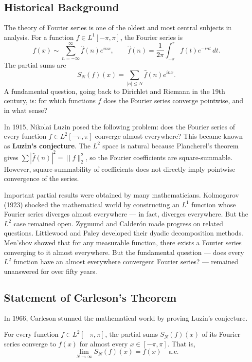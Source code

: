 \subsection{Historical Background}

The theory of Fourier series is one of the oldest and most central subjects in analysis. For a function \(f \in L^1[-\pi,\pi]\), the Fourier series is
\[
f(x) \sim \sum_{n=-\infty}^\infty \widehat{f}(n) e^{inx}, \qquad \widehat{f}(n) = \frac{1}{2\pi} \int_{-\pi}^\pi f(t) e^{-int}\,dt.
\]
The partial sums are
\[
S_N(f)(x) = \sum_{|n| \leq N} \widehat{f}(n) e^{inx}.
\]
A fundamental question, going back to Dirichlet and Riemann in the 19th century, is: for which functions \(f\) does the Fourier series converge pointwise, and in what sense?

In 1915, Nikolai Luzin posed the following problem: does the Fourier series of every function \(f \in L^2[-\pi,\pi]\) converge almost everywhere? This became known as \textbf{Luzin's conjecture}. The \(L^2\) space is natural because Plancherel's theorem gives \(\sum |\widehat{f}(n)|^2 = \|f\|_2^2\), so the Fourier coefficients are square-summable. However, square-summability of coefficients does not directly imply pointwise convergence of the series.

Important partial results were obtained by many mathematicians. Kolmogorov (1923) shocked the mathematical world by constructing an \(L^1\) function whose Fourier series diverges almost everywhere --- in fact, diverges everywhere. But the \(L^2\) case remained open. Zygmund and Calder\'on made progress on related questions. Littlewood and Paley developed their dyadic decomposition methods. Men'shov showed that for any measurable function, there exists a Fourier series converging to it almost everywhere. But the fundamental question --- does every \(L^2\) function have an almost everywhere convergent Fourier series? --- remained unanswered for over fifty years.

\subsection{Statement of Carleson's Theorem}

In 1966, Carleson stunned the mathematical world by proving Luzin's conjecture.

\begin{theorem}
For every function \(f \in L^2[-\pi,\pi]\), the partial sums \(S_N(f)(x)\) of its Fourier series converge to \(f(x)\) for almost every \(x \in [-\pi,\pi]\). That is,
\[
\lim_{N \to \infty} S_N(f)(x) = f(x) \quad \text{a.e.}
\]
\end{theorem}

